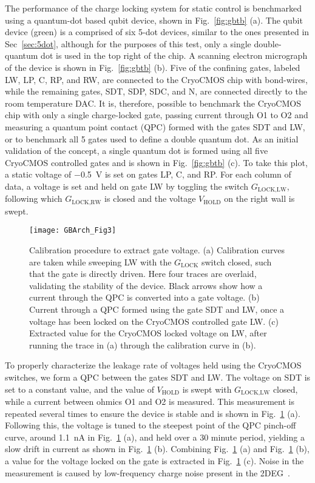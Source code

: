 The performance of the charge locking system for static control is benchmarked using a quantum-dot based qubit device, shown in Fig.~\ref{fig:gbtb} (a).
The qubit device (green) is a comprised of six 5-dot devices, similar to the ones presented in Sec~\ref{sec:5dot}, although for the purposes of this test, only a single double-quantum dot is used in the top right of the chip. A scanning electron micrograph of the device is shown in Fig.~\ref{fig:gbtb} (b).
Five of the confining gates, labeled LW, LP, C, RP, and RW, are connected to the CryoCMOS chip with bond-wires, while the remaining gates, SDT, SDP, SDC, and N, are connected directly to the room temperature DAC. It is, therefore, possible to benchmark the CryoCMOS chip with only a single charge-locked gate, passing current through O1 to O2 and measuring a quantum point contact (QPC) formed with the gates SDT and LW, or to benchmark all 5 gates used to define a double quantum dot. As an initial validation of the concept, a single quantum dot is formed using all five CryoCMOS controlled gates and is shown in Fig.~\ref{fig:gbtb} (c). To take this plot, a static voltage of \SI{-0.5}{\volt} is set on gates LP, C, and RP. For each column of data, a voltage is
set and held on gate LW by toggling the switch $G_\textrm{LOCK,LW}$, following which $G_\textrm{LOCK,RW}$ is closed and the voltage $V_\textrm{HOLD}$ on the right wall is swept.

\begin{figure}
  \texttt{[image: GBArch\_Fig3]}
  \caption[Voltage calibration procedure and hold time]
  {\label{fig:gbvc}Calibration procedure to extract gate voltage. (a) Calibration curves are taken while sweeping LW with the $G_\textrm{LOCK}$ switch closed, such that the gate is directly driven. Here four traces are overlaid, validating the stability of the device. Black arrows show how a current through the QPC is converted into a gate voltage. (b) Current through a QPC formed using the gate SDT and LW, once a voltage has been locked on the CryoCMOS controlled gate LW. (c) Extracted value for the CryoCMOS locked voltage on LW, after running the trace in (a) through the calibration curve in (b).}
\end{figure}

To properly characterize the leakage rate of voltages held using the CryoCMOS switches, we form a QPC between the gates SDT and LW. The voltage on SDT is set to
a constant value, and the value of $V_\textrm{HOLD}$ is swept with $G_\textrm{LOCK,LW}$ closed, while a current between ohmics O1 and O2 is measured. This measurement is
repeated several times to ensure the device is stable and is shown in Fig.~\ref{fig:gbvc} (a). Following this, the voltage is tuned to the steepest point of the QPC pinch-off
curve, around \SI{1.1}{\nano\ampere} in Fig.~\ref{fig:gbvc} (a), and held over a 30 minute period, yielding a slow drift in current as shown in Fig.~\ref{fig:gbvc} (b).
Combining Fig.~\ref{fig:gbvc} (a) and Fig.~\ref{fig:gbvc} (b), a value for the voltage locked on the gate is extracted in Fig.~\ref{fig:gbvc} (c). Noise in the measurement
is caused by low-frequency charge noise present in the 2DEG~\cite{PhysRevApplied.9.034008}.

